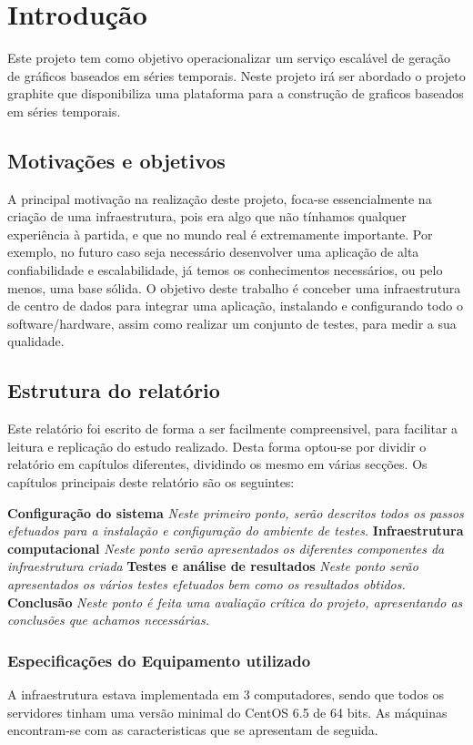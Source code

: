 \section{Introdução}
Este projeto tem como objetivo operacionalizar um serviço escalável de geração de gráficos baseados em séries temporais.
Neste projeto irá ser abordado o projeto graphite que disponibiliza uma plataforma para a construção de graficos baseados em séries temporais.

\subsection{Motivações e objetivos}

A principal motivação na realização deste projeto, foca-se essencialmente na criação de uma infraestrutura, pois era algo que não tínhamos qualquer experiência à partida, e que no mundo real é extremamente importante. Por exemplo, no futuro caso seja necessário desenvolver uma aplicação de alta confiabilidade e escalabilidade, já temos os conhecimentos
necessários, ou pelo menos, uma base sólida.
O objetivo deste trabalho é conceber uma infraestrutura de centro de dados para integrar uma aplicação, instalando e configurando todo o software/hardware, assim como realizar um conjunto de testes, para medir a sua qualidade.

\subsection{Estrutura do relatório}
Este relatório foi escrito de forma a ser facilmente compreensivel, para facilitar a leitura e replicação do estudo realizado.
Desta forma optou-se por dividir o relatório em capítulos diferentes, dividindo os mesmo em várias secções. Os capítulos principais deste relatório são os seguintes:

\textbf{Configuração do sistema} \textit{Neste primeiro ponto, serão descritos todos os passos efetuados para a instalação e configuração do ambiente de testes.}
\textbf{Infraestrutura computacional} \textit{Neste ponto serão apresentados os diferentes componentes da infraestrutura criada}
\textbf{Testes e análise de resultados} \textit{Neste ponto serão apresentados os vários testes efetuados bem como os resultados obtidos.}
\textbf{Conclusão} \textit{Neste ponto é feita uma avaliação crítica do projeto, apresentando as conclusões que achamos necessárias.}

\subsubsection{Especificações do Equipamento utilizado}
A infraestrutura estava implementada em 3 computadores, sendo que todos os servidores tinham uma versão minimal do CentOS 6.5 de 64 bits. As máquinas encontram-se com as caracteristicas que se apresentam de seguida.


